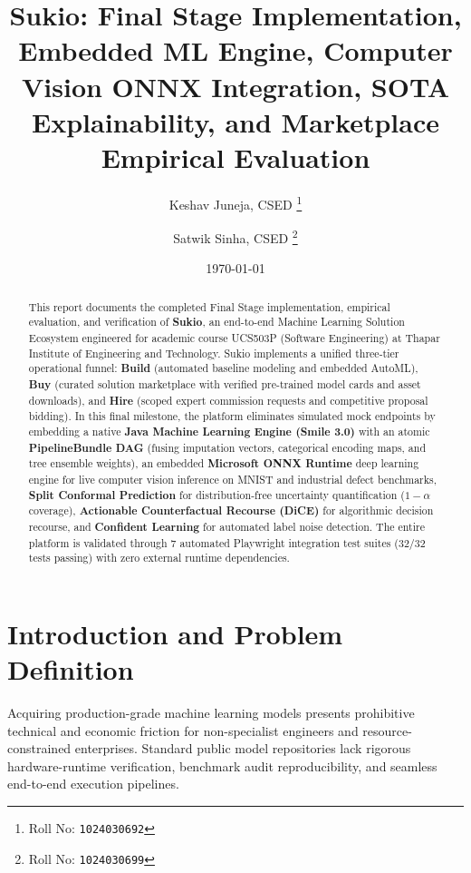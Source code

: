 \documentclass[11pt,a4paper]{article}
\title{Sukio: Final Stage Implementation, Embedded ML Engine, Computer Vision ONNX Integration, SOTA Explainability, and Marketplace Empirical Evaluation}
\author{
  Keshav Juneja, CSED%
  \thanks{Roll No: \texttt{1024030692}}
  \and
  Satwik Sinha, CSED%
  \thanks{Roll No: \texttt{1024030699}}
}
\date{\today}
\begin{document}
\maketitle

\begin{abstract}
This report documents the completed Final Stage implementation, empirical evaluation, and verification of \textbf{Sukio}, an end-to-end Machine Learning Solution Ecosystem engineered for academic course UCS503P (Software Engineering) at Thapar Institute of Engineering and Technology. Sukio implements a unified three-tier operational funnel: \textbf{Build} (automated baseline modeling and embedded AutoML), \textbf{Buy} (curated solution marketplace with verified pre-trained model cards and asset downloads), and \textbf{Hire} (scoped expert commission requests and competitive proposal bidding). In this final milestone, the platform eliminates simulated mock endpoints by embedding a native \textbf{Java Machine Learning Engine (Smile 3.0)} with an atomic \textbf{PipelineBundle DAG} (fusing imputation vectors, categorical encoding maps, and tree ensemble weights), an embedded \textbf{Microsoft ONNX Runtime} deep learning engine for live computer vision inference on MNIST and industrial defect benchmarks, \textbf{Split Conformal Prediction} for distribution-free uncertainty quantification ($1-\alpha$ coverage), \textbf{Actionable Counterfactual Recourse (DiCE)} for algorithmic decision recourse, and \textbf{Confident Learning} for automated label noise detection. The entire platform is validated through 7 automated Playwright integration test suites (32/32 tests passing) with zero external runtime dependencies.
\end{abstract}

\section{Introduction and Problem Definition}
Acquiring production-grade machine learning models presents prohibitive technical and economic friction for non-specialist engineers and resource-constrained enterprises. Standard public model repositories lack rigorous hardware-runtime verification, benchmark audit reproducibility, and seamless end-to-end execution pipelines.
\end{document}
